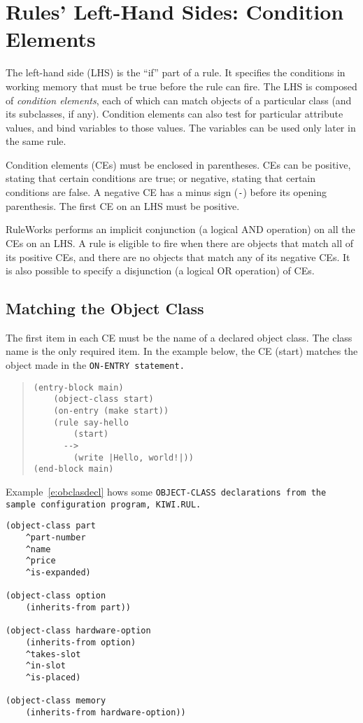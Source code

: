 \chapter{Rules' Left-Hand Sides: Condition Elements}
\label{c:conditionelements}

The left-hand side (LHS) is the ``if'' part of a rule. It specifies
the conditions in working memory that must be true before the rule can
fire. The LHS is composed of \emph{condition elements}, each of which
can match objects of a particular class (and its subclasses, if
any). Condition elements can also test for particular attribute
values, and bind variables to those values. The variables can be used
only later in the same rule.

Condition elements (CEs) must be enclosed in parentheses.  CEs can be
positive, stating that certain conditions are true; or negative,
stating that certain conditions are false. A negative CE has a minus
sign (\verb|-|) before its opening parenthesis. The first CE on an LHS
must be positive.

RuleWorks performs an implicit conjunction (a logical AND operation)
on all the CEs on an LHS. A rule is eligible to fire when there are
objects that match all of its positive CEs, and there are no objects
that match any of its negative CEs. It is also possible to specify a
disjunction (a logical OR operation) of CEs.

\section{Matching the Object Class}

The first item in each CE must be the name of a declared
object class. The class name is the only required item. In
the example below, the CE (start) matches the object made
in the \tt{ON-ENTRY} statement.

\begin{quote}
\begin{verbatim}
(entry-block main)
    (object-class start)
    (on-entry (make start))
    (rule say-hello
        (start)
      -->
        (write |Hello, world!|))
(end-block main)
\end{verbatim}
\end{quote}

Example~\ref{e:obclasdecl} hows some \tt{OBJECT-CLASS} declarations
from the sample configuration program, \tt{KIWI.RUL}.

\begin{exampl}
\begin{verbatim}
(object-class part
    ^part-number
    ^name
    ^price
    ^is-expanded)

(object-class option
    (inherits-from part))

(object-class hardware-option
    (inherits-from option)
    ^takes-slot
    ^in-slot
    ^is-placed)

(object-class memory
    (inherits-from hardware-option))
\end{verbatim}
\label{e:obclasdecl}
\end{exampl}

